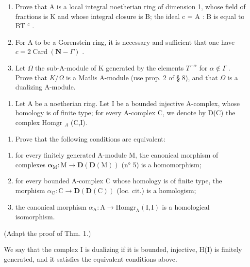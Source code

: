 \begin{enumerate}
\def\labelenumi{\alph{enumi})}
\item
  Prove that A is a local integral noetherian ring of dimension 1, whose field of fractions is K and whose integral closure is B; the ideal c = A : B is equal to BT \(^{c}\) .
\item
  For A to be a Gorenstein ring, it is necessary and sufficient that one have \(c = 2\operatorname{Card}(\mathbf{N} - \Gamma)\) .
\item
  Let \(\Omega\) the sub-A-module of K generated by the elements \(T^{-\alpha}\) for \(\alpha \notin \Gamma\) . Prove that \(K/\Omega\) is a Matlis A-module (use prop. 2 of § 8), and that \(\Omega\) is a dualizing A-module.
\end{enumerate}

\begin{enumerate}
\def\labelenumi{\arabic{enumi})}
\setcounter{enumi}{9}
\tightlist
\item
  Let A be a noetherian ring. Let I be a bounded injective A-complex, whose homology is of finite type; for every A-complex C, we denote by D(C) the complex Homgr \(_{A}\) (C,I).
\end{enumerate}

\begin{enumerate}
\def\labelenumi{\alph{enumi})}
\tightlist
\item
  Prove that the following conditions are equivalent:
\end{enumerate}

\begin{enumerate}
\def\labelenumi{(\roman{enumi})}
\item
  for every finitely generated A-module M, the canonical morphism of complexes \(\boldsymbol{\alpha}_{\mathrm{M}}:\mathrm{M}\to\mathbf{D}(\mathbf{D}(\mathrm{M}))\) (n° 5) is a homomorphism;
\item
  for every bounded A-complex C whose homology is of finite type, the morphism \(\alpha_{\mathrm{C}}: \mathrm{C} \to \mathbf{D}(\mathbf{D}(\mathrm{C}))\) (loc. cit.) is a homologism;
\item
  the canonical morphism \(\alpha_{\mathrm{A}}:\mathrm{A}\to \mathrm{Homgr}_{\mathrm{A}}(\mathrm{I},\mathrm{I})\) is a homological isomorphism.
\end{enumerate}

(Adapt the proof of Thm. 1.)

We say that the complex I is dualizing if it is bounded, injective, H(I) is finitely generated, and it satisfies the equivalent conditions above.

